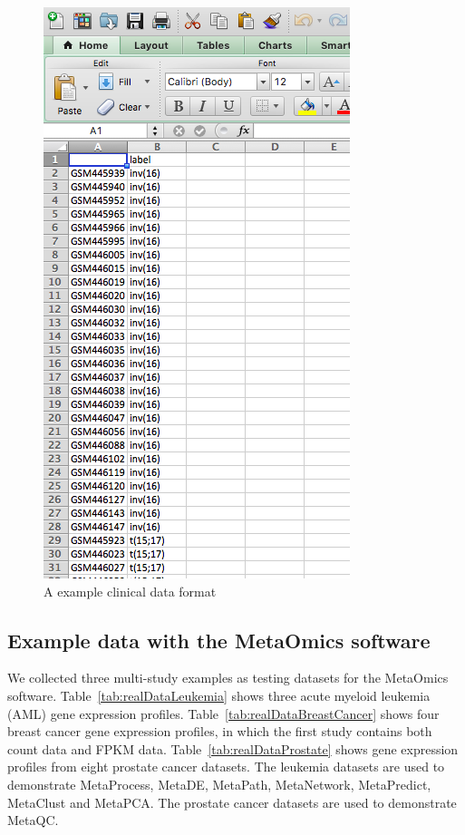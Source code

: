 \begin{figure}[H]
\begin{center}
\includegraphics[scale=0.5]{./figure/dataPreparation/clinicalData}
\caption{A example clinical data format}
\label{fig:clinical}
\end{center}
\end{figure}

\subsection{Example data with the MetaOmics software}


We collected three multi-study examples as testing datasets for the MetaOmics software.
Table~\ref{tab:realDataLeukemia} shows three acute myeloid leukemia (AML) gene expression profiles.
Table~\ref{tab:realDataBreastCancer} shows four breast cancer gene expression profiles, in which the first study contains both count data and FPKM data.
Table~\ref{tab:realDataProstate} shows gene expression profiles from eight prostate cancer datasets.
The leukemia datasets are used to demonstrate MetaProcess, MetaDE, MetaPath, MetaNetwork, MetaPredict, MetaClust and MetaPCA.
The prostate cancer datasets are used to demonstrate MetaQC.

